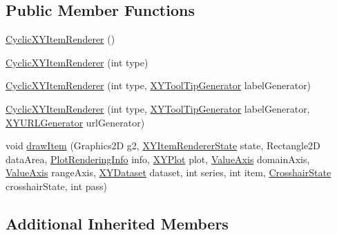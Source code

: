\subsection*{Public Member Functions}
\begin{DoxyCompactItemize}
\item 
\mbox{\hyperlink{classorg_1_1jfree_1_1chart_1_1renderer_1_1xy_1_1_cyclic_x_y_item_renderer_a59b929bd36e803496658638f1667ca64}{Cyclic\+X\+Y\+Item\+Renderer}} ()
\item 
\mbox{\hyperlink{classorg_1_1jfree_1_1chart_1_1renderer_1_1xy_1_1_cyclic_x_y_item_renderer_a665298b147d4772b40c800425b0ddd81}{Cyclic\+X\+Y\+Item\+Renderer}} (int type)
\item 
\mbox{\hyperlink{classorg_1_1jfree_1_1chart_1_1renderer_1_1xy_1_1_cyclic_x_y_item_renderer_a118969b7a23bf99acedb4168b2531a68}{Cyclic\+X\+Y\+Item\+Renderer}} (int type, \mbox{\hyperlink{interfaceorg_1_1jfree_1_1chart_1_1labels_1_1_x_y_tool_tip_generator}{X\+Y\+Tool\+Tip\+Generator}} label\+Generator)
\item 
\mbox{\hyperlink{classorg_1_1jfree_1_1chart_1_1renderer_1_1xy_1_1_cyclic_x_y_item_renderer_abcf1e1a868a535c8f7ff4ab8edca02b2}{Cyclic\+X\+Y\+Item\+Renderer}} (int type, \mbox{\hyperlink{interfaceorg_1_1jfree_1_1chart_1_1labels_1_1_x_y_tool_tip_generator}{X\+Y\+Tool\+Tip\+Generator}} label\+Generator, \mbox{\hyperlink{interfaceorg_1_1jfree_1_1chart_1_1urls_1_1_x_y_u_r_l_generator}{X\+Y\+U\+R\+L\+Generator}} url\+Generator)
\item 
void \mbox{\hyperlink{classorg_1_1jfree_1_1chart_1_1renderer_1_1xy_1_1_cyclic_x_y_item_renderer_ad65b27f80e77aeac1578ef3c792bf3f5}{draw\+Item}} (Graphics2D g2, \mbox{\hyperlink{classorg_1_1jfree_1_1chart_1_1renderer_1_1xy_1_1_x_y_item_renderer_state}{X\+Y\+Item\+Renderer\+State}} state, Rectangle2D data\+Area, \mbox{\hyperlink{classorg_1_1jfree_1_1chart_1_1plot_1_1_plot_rendering_info}{Plot\+Rendering\+Info}} info, \mbox{\hyperlink{classorg_1_1jfree_1_1chart_1_1plot_1_1_x_y_plot}{X\+Y\+Plot}} plot, \mbox{\hyperlink{classorg_1_1jfree_1_1chart_1_1axis_1_1_value_axis}{Value\+Axis}} domain\+Axis, \mbox{\hyperlink{classorg_1_1jfree_1_1chart_1_1axis_1_1_value_axis}{Value\+Axis}} range\+Axis, \mbox{\hyperlink{interfaceorg_1_1jfree_1_1data_1_1xy_1_1_x_y_dataset}{X\+Y\+Dataset}} dataset, int series, int item, \mbox{\hyperlink{classorg_1_1jfree_1_1chart_1_1plot_1_1_crosshair_state}{Crosshair\+State}} crosshair\+State, int pass)
\end{DoxyCompactItemize}
\subsection*{Additional Inherited Members}


